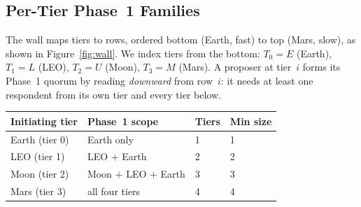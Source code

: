 \documentclass[letterpaper,twocolumn,10pt]{article}
\newcounter{prop}
\begin{document}
\subsection{Per-Tier Phase~1 Families}

The wall maps tiers to rows, ordered bottom (Earth, fast) to top (Mars, slow), as shown in Figure~\ref{fig:wall}. We index tiers from the bottom: $T_0 = E$ (Earth), $T_1 = L$ (LEO), $T_2 = U$ (Moon), $T_3 = M$ (Mars). A proposer at tier~$i$ forms its Phase~1 quorum by reading \emph{downward} from row~$i$: it needs at least one respondent from its own tier and every tier below.

\begin{center}
\small
\begin{tabular}{llll}
\toprule
Initiating tier & Phase~1 scope & Tiers & Min size \\
\midrule
Earth (tier 0) & Earth only & 1 & 1 \\
LEO (tier 1) & LEO $+$ Earth & 2 & 2 \\
Moon (tier 2) & Moon $+$ LEO $+$ Earth & 3 & 3 \\
Mars (tier 3) & all four tiers & 4 & 4 \\
\bottomrule
\end{tabular}
\end{center}
\end{document}
